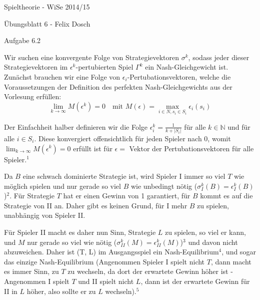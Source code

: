 \documentclass{scrartcl}
\begin{document}
\begin{LARGE}
Spieltheorie - WiSe 2014/15
\end{LARGE}

\begin{Large}
Übungsblatt 6 - Felix Dosch\\[1.0cm]
\end{Large}

\begin{Large}
Aufgabe 6.2\\[0.0cm]
\end{Large}

Wir suchen eine konvergente Folge von Strategievektoren
$\sigma^k$, sodass jeder dieser Strategievektoren im $\epsilon^k$-pertubierten Spiel $\Gamma^k$ ein
Nash-Gleichgewicht ist. \\

Zunächst brauchen wir eine Folge von $\epsilon_i$-Pertubationsvektoren, welche die Voraussetzungen der
Definition des perfekten Nash-Gleichgewichts aus der Vorlesung erfüllen:
\[
\lim_{k \to \infty} M(\epsilon^k) = 0 \quad \text{mit } M(\epsilon) = \max_{i \in N,s_i \in S_i}
{\epsilon_i(s_i)}
\]

Der Einfachheit halber definieren wir die Folge $\epsilon^k_{i} = \frac{1}{k+|S_i|}$ für alle 
$k \in \mathbb{N}$ und für alle $i \in S_i$. Diese konvergiert offensichtlich für jeden Spieler nach 0,
womit $\lim_{k \to \infty} M(\epsilon^k) = 0$ erfüllt ist für $\epsilon =$ Vektor der
Pertubationsvektoren für alle Spieler.$^1$

Da $B$ eine schwach dominierte Strategie ist, wird Spieler I immer so viel $T$ wie möglich spielen
und nur gerade so viel $B$ wie unbedingt nötig ($\sigma^k_I(B) = \epsilon^k_I(B)$)$^2$. Für Strategie
$T$ hat er einen Gewinn von 1 garantiert, für $B$ kommt es auf die Strategie von II an. Daher gibt 
es keinen Grund, für I mehr $B$ zu spielen, unabhängig von Spieler II.

Für Spieler II macht es daher nun Sinn, Strategie $L$ zu spielen, so viel er kann, und $M$ nur gerade
so viel wie nötig ($\sigma^k_{II}(M) = \epsilon^k_{II}(M)$)$^3$ und davon nicht abzuweichen. Daher ist
(T, L) im Ausgangsspiel ein Nash-Equilibrium$^4$, und sogar das einzige Nash-Equilibrium (Angenommen
Spieler I spielt nicht $T$, dann macht es immer Sinn, zu $T$ zu wechseln, da dort der erwartete Gewinn 
höher ist - Angenommen I spielt $T$ und II spielt nicht $L$, dann ist der erwartete Gewinn für II in $L$ 
höher, also sollte er zu $L$ wechseln).$^5$\\
\end{document}
